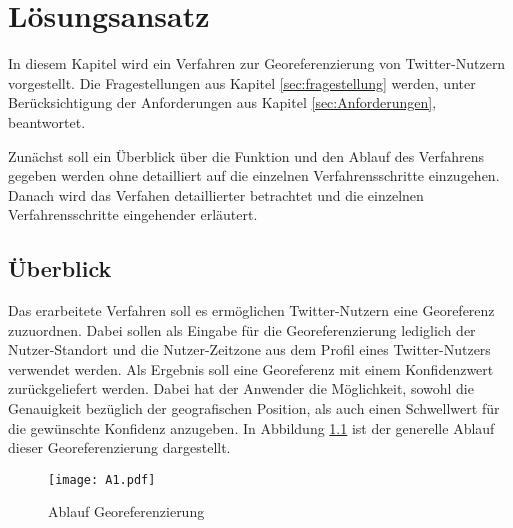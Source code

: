 \chapter{Lösungsansatz} \label{chp:Loesungsansatz}
In diesem Kapitel wird ein Verfahren zur Georeferenzierung von Twitter-Nutzern vorgestellt.
Die Fragestellungen aus Kapitel \ref{sec:fragestellung} werden, unter Berücksichtigung der Anforderungen aus Kapitel \ref{sec:Anforderungen}, beantwortet.  

Zunächst soll ein Überblick über die Funktion und den Ablauf des Verfahrens gegeben werden ohne detailliert auf die einzelnen Verfahrensschritte einzugehen.
Danach wird das Verfahen detaillierter betrachtet und die einzelnen Verfahrensschritte eingehender erläutert. 

	\section{Überblick} \label{sec:ueberblick} 
	Das erarbeitete Verfahren soll es ermöglichen Twitter-Nutzern eine Georeferenz zuzuordnen.
	Dabei sollen als Eingabe für die Georeferenzierung lediglich der Nutzer-Standort und die Nutzer-Zeitzone aus dem Profil eines Twitter-Nutzers verwendet werden.
	Als Ergebnis soll eine Georeferenz mit einem Konfidenzwert zurückgeliefert werden. 
	Dabei hat der Anwender die Möglichkeit, sowohl die Genauigkeit bezüglich der geografischen Position, als auch einen Schwellwert für die gewünschte Konfidenz anzugeben.
	In Abbildung \ref{img:georef} ist der generelle Ablauf dieser Georeferenzierung dargestellt. 
	

	\begin{figure}[h!]
		\begin{center}
			\texttt{[image: A1.pdf]}
			\caption{Ablauf Georeferenzierung}
			\label{img:georef}
		\end{center}
	\end{figure}	

